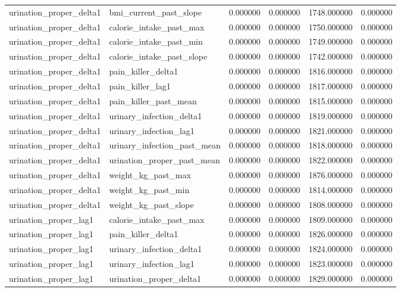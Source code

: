 \begin{longtable}{llrrrr}
urination\_proper\_delta1 & bmi\_current\_past\_slope & 0.000000 & 0.000000 & 1748.000000 & 0.000000 \\
urination\_proper\_delta1 & calorie\_intake\_past\_max & 0.000000 & 0.000000 & 1750.000000 & 0.000000 \\
urination\_proper\_delta1 & calorie\_intake\_past\_min & 0.000000 & 0.000000 & 1749.000000 & 0.000000 \\
urination\_proper\_delta1 & calorie\_intake\_past\_slope & 0.000000 & 0.000000 & 1742.000000 & 0.000000 \\
urination\_proper\_delta1 & pain\_killer\_delta1 & 0.000000 & 0.000000 & 1816.000000 & 0.000000 \\
urination\_proper\_delta1 & pain\_killer\_lag1 & 0.000000 & 0.000000 & 1817.000000 & 0.000000 \\
urination\_proper\_delta1 & pain\_killer\_past\_mean & 0.000000 & 0.000000 & 1815.000000 & 0.000000 \\
urination\_proper\_delta1 & urinary\_infection\_delta1 & 0.000000 & 0.000000 & 1819.000000 & 0.000000 \\
urination\_proper\_delta1 & urinary\_infection\_lag1 & 0.000000 & 0.000000 & 1821.000000 & 0.000000 \\
urination\_proper\_delta1 & urinary\_infection\_past\_mean & 0.000000 & 0.000000 & 1818.000000 & 0.000000 \\
urination\_proper\_delta1 & urination\_proper\_past\_mean & 0.000000 & 0.000000 & 1822.000000 & 0.000000 \\
urination\_proper\_delta1 & weight\_kg\_past\_max & 0.000000 & 0.000000 & 1876.000000 & 0.000000 \\
urination\_proper\_delta1 & weight\_kg\_past\_min & 0.000000 & 0.000000 & 1814.000000 & 0.000000 \\
urination\_proper\_delta1 & weight\_kg\_past\_slope & 0.000000 & 0.000000 & 1808.000000 & 0.000000 \\
urination\_proper\_lag1 & calorie\_intake\_past\_max & 0.000000 & 0.000000 & 1809.000000 & 0.000000 \\
urination\_proper\_lag1 & pain\_killer\_delta1 & 0.000000 & 0.000000 & 1826.000000 & 0.000000 \\
urination\_proper\_lag1 & urinary\_infection\_delta1 & 0.000000 & 0.000000 & 1824.000000 & 0.000000 \\
urination\_proper\_lag1 & urinary\_infection\_lag1 & 0.000000 & 0.000000 & 1823.000000 & 0.000000 \\
urination\_proper\_lag1 & urination\_proper\_delta1 & 0.000000 & 0.000000 & 1829.000000 & 0.000000 \\

\end{longtable}
